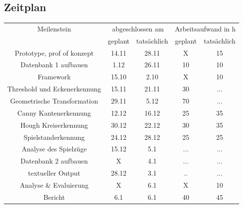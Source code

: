 \documentclass[paper=A4, deutsch]{scrartcl}
\begin{document}
\subsection{Zeitplan}

\begin{table}[h!]
	\centering
	\begin{tabular}{|c|c|c|c|c|}
		\hline
		Meilenstein & \multicolumn{2}{c|}{abgeschlossen am} & \multicolumn{2}{c|}{Arbeitsaufwand in h}\\
		\cline{2-5}
		 & geplant & tatsächlich & geplant & tatsächlich\\
		\hline
				Prototype, prof of konzept & 14.11 & 28.11 & X & 15\\
		\hline
				Datenbank 1 aufbauen & 1.12 & 26.11 & 10 & 10\\
		\hline
				Framework &15.10 &2.10 & X & 10\\
		\hline	
				Threshold und Eckenerkennung & 15.11 & 21.11 & 30 &...\\
		\hline	
				Geometrische Transformation & 29.11 & 5.12 & 70 &...\\
		\hline	
				Canny Kantenerkennung & 12.12 & 16.12 & 25 & 35\\
		\hline	
				Hough Kreiserkennung & 30.12 & 22.12 & 30 & 35\\
		\hline	
				Spielstanderkennung & 24.12 & 28.12 & 25 & 25\\
		\hline	
				Analyse des Spielzüge & 15.12 & 5.1 &... &...\\
		\hline	
				Datenbank 2 aufbauen & X & 4.1 &... &...\\
		\hline
				textueller Output & 28.12 &  3.1 &..&... \\
		\hline 
				Analyse \& Evaluierung & X & 6.1 & X & 10\\
		\hline
				Bericht & 6.1 & 6.1 & 40 & 45\\
		\hline
	\end{tabular}
\end{table}

\end{document}
